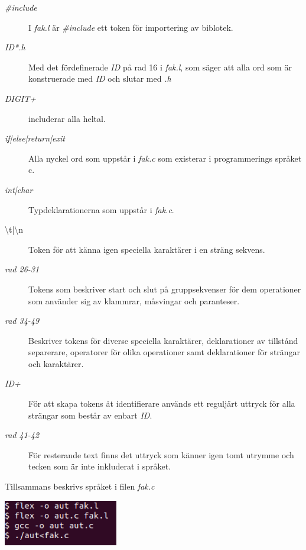\newpage


\begin{description}

\item[\textit{\#include}] I \textit{fak.l} är \textit{\#include} ett token för importering av biblotek. 

\item[\textit{{ID}*.h}] Med det fördefinerade \textit{ID} på rad 16 i
\textit{fak.l}, som säger att alla ord som är konstruerade med \textit{ID} och slutar
med \textit{.h}

\item[\textit{{DIGIT}+}] includerar alla heltal.

\item[\textit{if|else|return|exit}] Alla nyckel ord som uppstår i \textit{fak.c }
som existerar i programmerings språket c.

\item[\textit{int|char}] Typdeklarationerna som uppstår i \textit{fak.c}. 

\item[\textbackslash t|\textbackslash n] Token för att känna igen speciella karaktärer i en sträng sekvens.

\item[\textit{rad 26-31}] Tokens som beskriver start och slut på gruppsekvenser för dem
operationer som använder sig av klammrar, måsvingar och paranteser.

\item[\textit{rad 34-49}] Beskriver tokens för diverse speciella karaktärer, deklarationer av
tillstånd separerare, operatorer för olika operationer samt deklarationer för strängar och
karaktärer.

\item[\textit{{ID}+}] För att skapa tokens åt identifierare används ett reguljärt uttryck för alla strängar som
består av enbart \textit{ID}.

\item[\textit{rad 41-42}] För resterande text finns det uttryck som känner igen tomt utrymme och
tecken som är inte inkluderat i språket.

\end{description}

 Tillsammans beskrivs språket i filen \textit{fak.c}


\begin{center}
    \includegraphics[height=2cm]{bilder/flex_command.png}
    \label{fig:flex}
\end{center}

